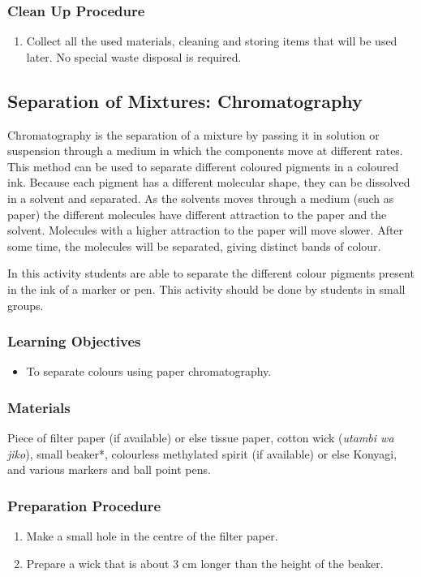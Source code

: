 \subsubsection*{Clean Up Procedure}
\begin{enumerate}
\item{Collect all the used materials, cleaning and storing items that will be used later. No special waste disposal is required.}
\end{enumerate}


\subsection{Separation of Mixtures: Chromatography}
Chromatography is the separation of a mixture by passing it in solution or suspension through a medium in which the components move at different rates. This method can be used to separate different coloured pigments in a coloured ink. Because each pigment has a different molecular shape, they can be dissolved in a solvent and separated. As the solvents moves through a medium (such as paper) the different molecules have different attraction to the paper and the solvent. Molecules with a higher attraction to the paper will move slower. After some time, the molecules will be separated, giving distinct bands of colour.

In this activity students are able to separate the different colour pigments present in the ink of a marker or pen. This activity should be done by students in small groups.
\subsubsection*{Learning Objectives}
\begin{itemize}

\item{To separate colours using paper chromatography.}

\end{itemize}

\subsubsection*{Materials}
Piece of filter paper (if available) or else tissue paper, cotton wick (\textit{utambi wa jiko}), small beaker*, colourless methylated spirit (if available) or else Konyagi, and various markers and ball point pens.

\subsubsection*{Preparation Procedure}
\begin{enumerate}
\item{Make a small hole in the centre of the filter paper.}
\item{Prepare a wick that is about 3 cm longer than the height of the beaker.}
\end{enumerate}

